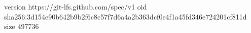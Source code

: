 version https://git-lfs.github.com/spec/v1
oid sha256:3d154e90b642b9b2f6c8c57f7d6a4a2b363dcf0e4f1a45fd346e724201cf811d
size 497736
